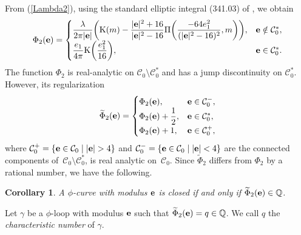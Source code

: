 \documentclass[pdftex]{sigma}
\def\Phit{\widetilde\Phi}
\def\gam{\gamma} %
\newcommand\be{{\bf e}}
\numberwithin{equation}{section}
\newtheorem{Corollary}[Theorem]{Corollary}
\begin{document}
From (\ref{Lambda2}), using the standard elliptic integral (341.03) of \cite{BF}, we obtain
\[
\Phi_2(\be)=\begin{cases}\displaystyle \frac{\lambda}{2\pi |\be|}\biggl({\rm K}(m)-
\frac{|\be |^2+16}{|\be |^2-16}\Pi \biggl(\frac{-64e_1^2}{(|\be |^2-16)^2},m\biggr)\biggr), &\be\notin {\mathcal C}_0^*,\\
\displaystyle \frac{e_1}{4\pi}{\rm K}\biggl(\frac{e_1^2}{16}\biggr), & \be\in {\mathcal C}_0^*.
\end{cases}
\]
The function $\Phi_2$ is real-analytic on ${\mathcal C}_0\setminus {\mathcal C}^*_0$ and has a jump discontinuity on ${\mathcal C}^*_0$. However, its regularization
\[
\Phit_2(\be)=\begin{cases}\displaystyle \Phi_2(\be), & \be\in {\mathcal C}^-_0,\\
\displaystyle\Phi_2(\be)+\frac{1}{2}, & \be\in {\mathcal C}^*_0,\\
\displaystyle\Phi_2(\be)+1, & \be\in {\mathcal C}^+_0,
 \end{cases}
 \]
 where ${\mathcal C}^{+}_0=\{\be\in {\mathcal C}_0 \mid |\be|>4\}$ and ${\mathcal C}^{-}_0=\{\be\in {\mathcal C}_0 \mid |\be|<4\}$ are the connected components of~${\mathcal C}_0\setminus {\mathcal C}^*_0$, is real analytic on~${\mathcal C}_0$.
 Since $\Phit_2$ differs from $\Phi_2$ by a rational number, we have the following.

 \begin{Corollary} A $\phi$-curve with modulus $\be$ is closed if and only if
 $\Phit_2(\be)\in {\mathbb Q}$.\end{Corollary}

 \begin{Definition} Let $\gam$ be a $\phi$-loop with modulus $\be$ such that $\Phit_2(\be)=q\in {\mathbb Q}$. We call $q$
 the {\it characteristic number} of $\gam$. \end{Definition}
\end{document}
